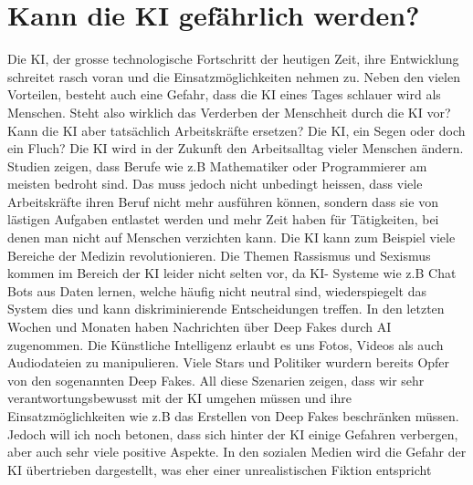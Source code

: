 \section{Kann die KI gefährlich werden?}
Die KI, der grosse technologische Fortschritt der heutigen Zeit, ihre  Entwicklung  schreitet rasch voran und die Einsatzmöglichkeiten nehmen zu. Neben den vielen Vorteilen, besteht auch eine Gefahr, dass die KI eines Tages schlauer wird als Menschen. Steht also wirklich das Verderben der Menschheit durch die KI vor? Kann die KI aber tatsächlich Arbeitskräfte ersetzen? Die KI, ein Segen oder doch ein Fluch? Die KI wird in der Zukunft den Arbeitsalltag vieler Menschen ändern. Studien zeigen, dass Berufe wie z.B Mathematiker oder Programmierer am meisten bedroht sind. Das muss jedoch nicht unbedingt heissen, dass viele Arbeitskräfte ihren Beruf nicht mehr ausführen können, sondern dass sie von lästigen Aufgaben entlastet werden und mehr Zeit haben für Tätigkeiten, bei denen man nicht auf Menschen verzichten kann. Die KI kann zum Beispiel viele Bereiche der Medizin revolutionieren. Die Themen Rassismus und Sexismus kommen im Bereich der KI leider nicht selten vor, da KI- Systeme wie z.B Chat Bots aus Daten lernen, welche häufig nicht neutral sind, wiederspiegelt das System dies und kann diskriminierende Entscheidungen treffen. In den letzten Wochen und Monaten haben Nachrichten über Deep Fakes durch AI zugenommen. Die Künstliche Intelligenz erlaubt es uns Fotos, Videos als auch Audiodateien zu manipulieren. Viele Stars und Politiker wurdern bereits Opfer von den sogenannten Deep Fakes. All diese Szenarien zeigen, dass wir sehr verantwortungsbewusst mit der KI umgehen müssen und ihre Einsatzmöglichkeiten wie z.B das Erstellen von Deep Fakes beschränken müssen. Jedoch will ich noch betonen, dass sich hinter der KI einige Gefahren verbergen, aber auch sehr viele positive Aspekte. In den sozialen Medien wird die Gefahr der KI übertrieben dargestellt, was eher einer unrealistischen Fiktion entspricht

